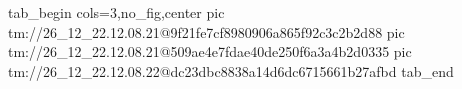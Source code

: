  
 
 
 
 

\qqSecOrig


\ifcmt
  tab_begin cols=3,no_fig,center
    pic tm://26_12_22.12.08.21@9f21fe7cf8980906a865f92c3c2b2d88
    pic tm://26_12_22.12.08.21@509ae4e7fdae40de250f6a3a4b2d0335
    pic tm://26_12_22.12.08.22@dc23dbc8838a14d6dc6715661b27afbd
  tab_end
\fi

